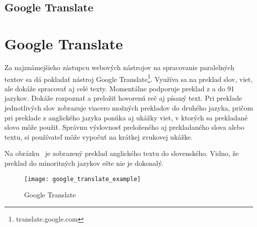 %
%
{
	\subsection{Google Translate}
}
{
	\section{Google Translate}
}
Za najznámejšieho zástupcu webových nástrojov na spracovanie paralelných textov sa dá pokladať nástroj Google Translate\footnote{translate.google.com}. Využíva sa na preklad slov, viet, ale dokáže spracovať aj celé texty. Momentálne podporuje preklad z a do 91 jazykov. Dokáže rozpoznať a preložiť hovorenú reč aj písaný text. Pri preklade jednotlivých slov zobrazuje viacero možných prekladov do druhého jazyka, pričom pri preklade z anglického jazyka ponúka aj ukážky viet, v ktorých sa prekladané slovo môže použiť. Správnu výslovnosť preloženého aj prekladaného slova alebo textu, si používateľ môže vypočuť na krátkej zvukovej ukážke.

Na obrázku~ je zobrazený preklad anglického textu do slovenského. Vidno, že preklad do minoritných jazykov ešte nie je dokonalý.

\begin{figure}[H]
	\begin{center}\texttt{[image: google\_translate\_example]}\end{center}
	\caption[Google Translate]{Google Translate}\label{fig:google_translate_example}
\end{figure}

